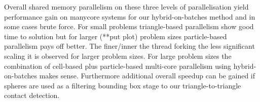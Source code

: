 Overall shared memory parallelism on these three levels of parallelisation yield performance gain on manycore systems for our hybrid-on-batches method and in some cases brute force. For small problems triangle-based parallelism show good time to solution but for larger (**put plot) problem sizes particle-based parallelism pays off better. The finer/inner the thread forking the less significant scaling it is observed for larger problem sizes. For large problem sizes the combination of cell-based plus particle-based multi-core parallelism using hybrid-on-batches makes sense. Furthermore additional overall speedup can be gained if spheres are used as a filtering bounding box stage to our triangle-to-triangle contact detection.

\clearpage

